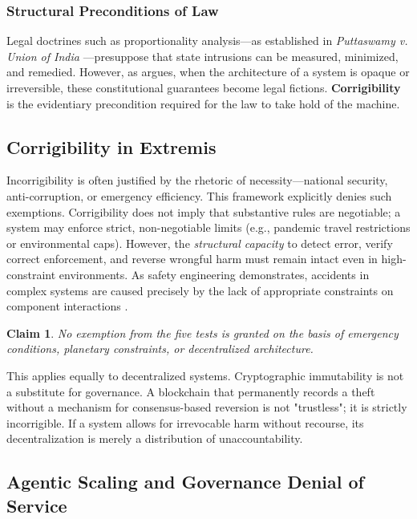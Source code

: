 \documentclass{article}
\newtheorem{claim}{Claim}
\begin{document}
\subsubsection{Structural Preconditions of Law}
Legal doctrines such as proportionality analysis---as established in \textit{Puttaswamy v. Union of India} \citep{puttaswamy2017}---presuppose that state intrusions can be measured, minimized, and remedied. However, as \citet{bhatia2019} argues, when the architecture of a system is opaque or irreversible, these constitutional guarantees become legal fictions. \textbf{Corrigibility} is the evidentiary precondition required for the law to take hold of the machine.

\subsection{Corrigibility in Extremis}

Incorrigibility is often justified by the rhetoric of necessity---national security, anti-corruption, or emergency efficiency. This framework explicitly denies such exemptions. Corrigibility does not imply that substantive rules are negotiable; a system may enforce strict, non-negotiable limits (e.g., pandemic travel restrictions or environmental caps). However, the \textit{structural capacity} to detect error, verify correct enforcement, and reverse wrongful harm must remain intact even in high-constraint environments. As safety engineering demonstrates, accidents in complex systems are caused precisely by the lack of appropriate constraints on component interactions \citep{leveson2011}.

\begin{claim}
No exemption from the five tests is granted on the basis of emergency conditions, planetary constraints, or decentralized architecture.
\end{claim}

This applies equally to decentralized systems. Cryptographic immutability is not a substitute for governance. A blockchain that permanently records a theft without a mechanism for consensus-based reversion is not "trustless"; it is strictly incorrigible. If a system allows for irrevocable harm without recourse, its decentralization is merely a distribution of unaccountability.

\subsection{Agentic Scaling and Governance Denial of Service}
\label{subsec:gdos}
\end{document}
